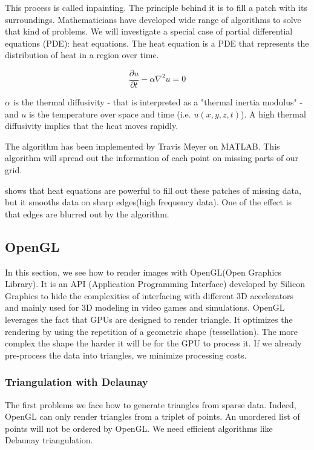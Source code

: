This process is called inpainting. The principle behind it is to fill a patch with its surroundings. Mathematicians have developed wide range of algorithms to solve that kind of problems. We will investigate a special case of partial differential equations (PDE): heat equations. 
The heat equation is a PDE that represents the distribution of heat in a region over time. 

\begin{equation}\label{eqn:heateq}
\frac{\partial u}{\partial t} - \alpha \nabla^2 u = 0
\end{equation}

$\alpha$ is the thermal diffusivity - that is interpreted as a "thermal inertia modulus" - and $u$ is the temperature over space and time (i.e. $u(x,y,z,t)$). A high thermal diffusivity implies that the heat moves rapidly.

The algorithm has been implemented by Travis Meyer on MATLAB. This algorithm will spread out the information of each point on missing parts of our grid.

\cite{aubert2006mathematical} shows that heat equations are powerful to fill out these patches of missing data, but it smooths data on sharp edges(high frequency data). One of the effect is that edges are blurred out by the algorithm.


\subsection{OpenGL}

In this section, we see how to render images with OpenGL(Open Graphics Library). It is an API (Application Programming Interface) developed by Silicon Graphics to hide the complexities of interfacing with different 3D accelerators and mainly used for 3D modeling in video games and simulations. OpenGL leverages the fact that GPUs are designed to render triangle. It optimizes the rendering by using the repetition of a geometric shape (tessellation). The more complex the shape the harder it will be for the GPU to process it. If we already pre-process the data into triangles, we minimize processing costs. \cite{abobegpu}

\subsubsection{Triangulation with Delaunay}

The first problems we face how to generate triangles from sparse data. Indeed, OpenGL can only render triangles from a triplet of points. An unordered list of points will not be ordered by OpenGL. We need efficient algorithms like Delaunay triangulation.

